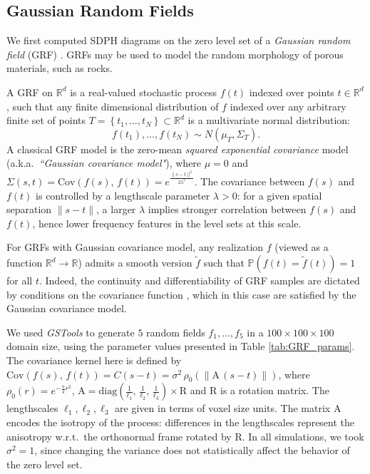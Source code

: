 \documentclass[11pt]{article}
\newcommand{\R}{\mathbb{R}}
\theoremstyle{plain}
\theoremstyle{definition}
\theoremstyle{remark}
\begin{document}
	\subsection{Gaussian Random Fields}
	\label{sec:GRF_applis}
	We first computed SDPH diagrams on the zero level set of a \textit{Gaussian random field} (GRF) \citep{adler_geometry_2010, gaetan_spatial_2010}. GRFs may be used to model the random morphology of porous materials, such as rocks.
	
	A GRF on $\mathbb{R}^d$ is a real-valued stochastic process $f(t)$ indexed over points $t \in \mathbb{R}^d$, such that any finite dimensional distribution of $f$ indexed over any arbitrary finite set of points $T = \left\{t_1, \ldots, t_N\right\} \subset \mathbb{R}^d$ is a multivariate normal distribution:
	$$f(t_1), \ldots, f(t_N) \sim N(\mu_T, \Sigma_{T}).$$
	A classical GRF model is the zero-mean \emph{squared exponential covariance} model (a.k.a.~\textit{``Gaussian covariance model"}), where $\mu = 0$ and $\Sigma(s,t) = \mathrm{Cov}\left(f(s),\, f(t)\right) = e^{\frac{\|s-t\|^2}{2\lambda^2}}.$
	The covariance between $f(s)$ and $f(t)$ is controlled by a lengthscale parameter $\lambda > 0$: for a given spatial separation $\| s-t \|$, a larger $\lambda$ implies stronger correlation between $f(s)$ and $f(t)$, hence lower frequency features in the level sets at this scale.
	
	For GRFs with Gaussian covariance model, any realization $f$ (viewed as a function $\R^d \to \R$) admits a smooth version $\tilde{f}$ such that $\mathbb{P}(f(t) = \tilde{f}(t)) = 1$ for all $t$. Indeed, the continuity and differentiability of GRF samples are dictated by conditions on the covariance function \citep[Theorem 3.4.1]{adler_geometry_2010}, which in this case are satisfied by the Gaussian covariance model.
	
	We used \textit{GSTools} \citep{muller_gstools_2022} to generate $5$ random fields $f_1, \ldots, f_5$ in a $100 \times 100 \times 100$ domain size, using the parameter values presented in Table \ref{tab:GRF_params}. The covariance kernel here is defined by $\mathrm{Cov}\left(f(s),\, f(t)\right) = C(s - t) = \sigma^2 \, \rho_0(\|\mathrm{A} \, (s - t) \|)$, where $\rho_0(r) = e^{- \frac{\pi}{4} r^2 }$, $\mathrm{A} = \mathrm{diag}(\frac{1}{\ell_1},\,\frac{1}{\ell_2},\,\frac{1}{\ell_3}) \times \mathrm{R}$ and $\mathrm{R}$ is a rotation matrix. The lengthscales $\ell_1,\ell_2,\ell_3$ are given in terms of voxel size units. The matrix $\mathrm{A}$ encodes the isotropy of the process: differences in the lengthscales represent the anisotropy w.r.t.~the orthonormal frame rotated by $\mathrm{R}$.
	In all simulations, we took $\sigma^2 = 1$, since changing the variance does not statistically affect the behavior of the zero level set.
	
\end{document}
